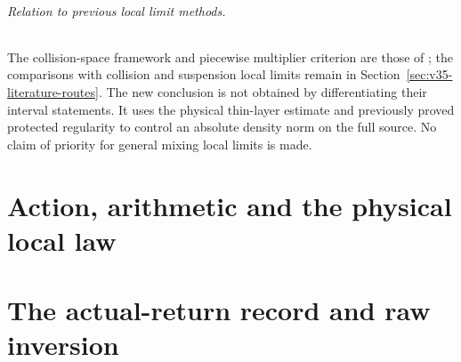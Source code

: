 \documentclass[11pt,reqno]{amsart}
\numberwithin{equation}{section}
\theoremstyle{definition}\newtheorem{definition}[theorem]{Definition}
\theoremstyle{remark}\newtheorem{remark}[theorem]{Remark}
\begin{document}
\paragraph{Relation to previous local limit methods.}
The collision-space framework and piecewise multiplier criterion are
those of \cite{DZ11,DZ,DPZ}; the comparisons with collision and
suspension local limits remain in
Section~\ref{sec:v35-literature-routes}. The new conclusion is not
obtained by differentiating their interval statements. It uses the
physical thin-layer estimate and previously proved protected
regularity to control an absolute density norm on the full source.
No claim of priority for general mixing local limits is made.

\part{Action, arithmetic and the physical local law}









\part{The actual-return record and raw inversion}
\end{document}
